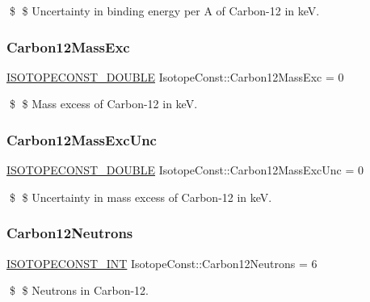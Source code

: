 \$ \$ Uncertainty in binding energy per A of Carbon-\/12 in keV. \mbox{\label{group___isotope_const-_carbon-_c12_gabfd0a0281a9c8d2030693f3501a9afb4}} 
\subsubsection{\texorpdfstring{Carbon12\+Mass\+Exc}{Carbon12MassExc}}
{\footnotesize\ttfamily \mbox{\hyperlink{group___isotope_const-_macros_ga8f45a7272ce02c0b4c65c44636ed719a}{I\+S\+O\+T\+O\+P\+E\+C\+O\+N\+S\+T\+\_\+\+D\+O\+U\+B\+LE}} Isotope\+Const\+::\+Carbon12\+Mass\+Exc = 0}

\$ \$ Mass excess of Carbon-\/12 in keV. \mbox{\label{group___isotope_const-_carbon-_c12_ga928f6a531842b72d8311cdb55b580b29}} 
\subsubsection{\texorpdfstring{Carbon12\+Mass\+Exc\+Unc}{Carbon12MassExcUnc}}
{\footnotesize\ttfamily \mbox{\hyperlink{group___isotope_const-_macros_ga8f45a7272ce02c0b4c65c44636ed719a}{I\+S\+O\+T\+O\+P\+E\+C\+O\+N\+S\+T\+\_\+\+D\+O\+U\+B\+LE}} Isotope\+Const\+::\+Carbon12\+Mass\+Exc\+Unc = 0}

\$ \$ Uncertainty in mass excess of Carbon-\/12 in keV. \mbox{\label{group___isotope_const-_carbon-_c12_ga3f2fcf3728766f39166e48e297d9f51f}} 
\subsubsection{\texorpdfstring{Carbon12\+Neutrons}{Carbon12Neutrons}}
{\footnotesize\ttfamily \mbox{\hyperlink{group___isotope_const-_macros_ga5f18360b3e99483a35c32d789e62621c}{I\+S\+O\+T\+O\+P\+E\+C\+O\+N\+S\+T\+\_\+\+I\+NT}} Isotope\+Const\+::\+Carbon12\+Neutrons = 6}

\$ \$ Neutrons in Carbon-\/12. \mbox{\label{group___isotope_const-_carbon-_c12_ga6adb9f6c008cb3ae288b0848106507bb}} 

